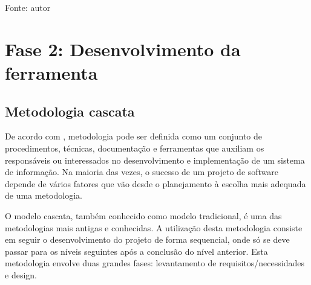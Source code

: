 \begin{table}[h]
	\centering
	\caption{Prioridade de conteúdos.}
	\label{prioridade}
	Fonte: autor
\end{table}


\section{Fase 2: Desenvolvimento da ferramenta}

\subsection{Metodologia cascata}

De acordo com , metodologia pode ser definida como um conjunto de procedimentos, técnicas, documentação e ferramentas que 
auxiliam os responsáveis ou interessados no desenvolvimento e implementação de um sistema de informação. Na maioria das vezes, o sucesso
de um projeto de software depende de vários fatores que vão desde o planejamento à escolha mais adequada de uma metodologia.

O modelo cascata, também conhecido como modelo tradicional, é uma das metodologias mais antigas e conhecidas. A utilização desta 
metodologia consiste em seguir o desenvolvimento do projeto de forma sequencial, onde só se deve passar para os níveis seguintes após
a conclusão do nível anterior. Esta metodologia envolve duas grandes fases: levantamento de requisitos/necessidades e design. \cite{semedo2012ganhos}

